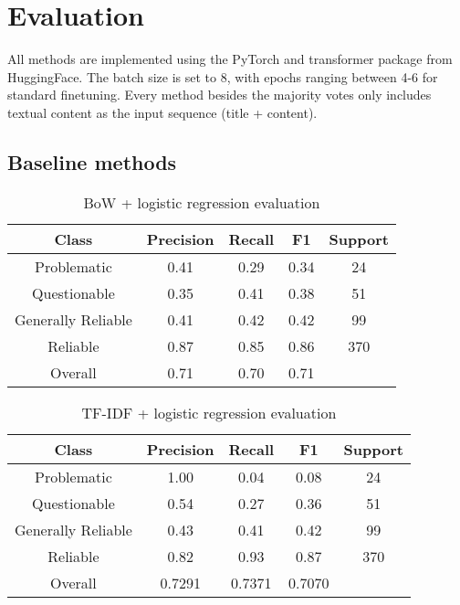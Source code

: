 \chapter{Evaluation}
\label{cha:6}

All methods are implemented using the PyTorch \cite{paszke-2017-pytorch} and transformer \cite{wolf-2020-huggingface} package from HuggingFace. The batch size is set to 8, with epochs ranging between 4-6 for standard finetuning. Every method besides the majority votes only includes textual content as the input sequence (title + content).

\section{Baseline methods}

\begin{table}[htbp]
    \centering
    \begin{tabular}{|| c | c | c | c | c ||}
        \hline
        Class              & Precision & Recall & F1   & Support \\
        \hline
        \hline
        Problematic        & 0.41      & 0.29   & 0.34 & 24      \\
        \hline
        Questionable       & 0.35      & 0.41   & 0.38 & 51      \\
        \hline
        Generally Reliable & 0.41      & 0.42   & 0.42 & 99      \\
        \hline
        Reliable           & 0.87      & 0.85   & 0.86 & 370     \\
        \hline
        Overall            & 0.71      & 0.70   & 0.71 &         \\
        \hline
    \end{tabular}
    \caption{BoW + logistic regression evaluation}
    \label{table:bow_logistic-eval}
\end{table}

\begin{table}[htbp]
    \centering
    \begin{tabular}{|| c | c | c | c | c ||}
        \hline
        Class              & Precision & Recall & F1     & Support \\
        \hline
        \hline
        Problematic        & 1.00      & 0.04   & 0.08   & 24      \\
        \hline
        Questionable       & 0.54      & 0.27   & 0.36   & 51      \\
        \hline
        Generally Reliable & 0.43      & 0.41   & 0.42   & 99      \\
        \hline
        Reliable           & 0.82      & 0.93   & 0.87   & 370     \\
        \hline
        Overall            & 0.7291    & 0.7371 & 0.7070 &         \\
        \hline
    \end{tabular}
    \caption{TF-IDF + logistic regression evaluation}
    \label{table:tfidf_logistic-eval}
\end{table}


